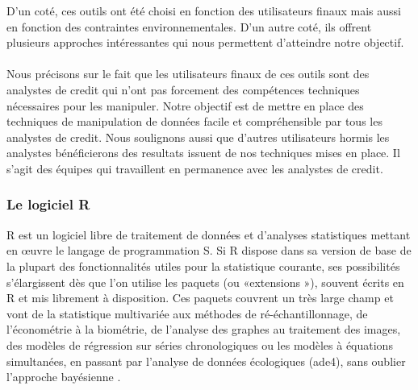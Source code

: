 \documentclass[11pt,a4paper]{report}
\begin{document}
D'un coté, ces outils ont été choisi en fonction des utilisateurs finaux mais aussi en fonction des contraintes environnementales. D'un autre coté, ils offrent plusieurs approches intéressantes qui nous permettent d'atteindre notre objectif.  \\\\
Nous précisons sur le fait que les utilisateurs finaux de ces outils sont des analystes de credit qui n'ont pas forcement des compétences techniques nécessaires pour les manipuler. Notre objectif est de mettre en place des techniques de manipulation de données facile et compréhensible par tous les analystes de credit. Nous soulignons aussi que d'autres utilisateurs hormis les analystes bénéficierons des resultats issuent de nos techniques mises en place. Il s'agit des équipes qui travaillent en permanence  avec les analystes de credit.  

\subsubsection{Le logiciel R}
R est un logiciel libre de traitement de données et d'analyses statistiques mettant en œuvre le langage de programmation S. 
Si R dispose dans sa version de base de la plupart des fonctionnalités utiles pour la statistique courante, ses possibilités s'élargissent dès que l'on utilise les paquets (ou «extensions »), souvent écrits en R et mis librement à disposition. Ces paquets couvrent un très large champ et vont de la statistique multivariée aux méthodes de ré-échantillonnage, de l'économétrie à la biométrie, de l'analyse des graphes au traitement des images, des modèles de régression sur séries chronologiques ou les modèles à équations simultanées, en passant par l'analyse de données écologiques (ade4), sans oublier l'approche bayésienne \cite{r}.

%
%
\end{document}

